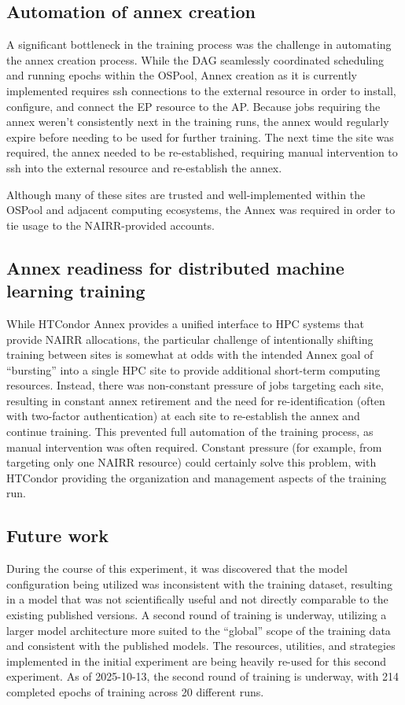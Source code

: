 \documentclass{article}
\begin{document}
\subsection{Automation of annex creation}
A significant bottleneck in the training process was the challenge in automating
the annex creation process. While the DAG seamlessly coordinated scheduling and
running epochs within the OSPool, Annex creation as it is currently implemented
requires ssh connections to the external resource in order to install,
configure, and connect the EP resource to the AP. Because jobs requiring the
annex weren't consistently next in the training runs, the annex would regularly
expire before needing to be used for further training. The next time the site
was required, the annex needed to be re-established, requiring manual
intervention to ssh into the external resource and re-establish the annex.

Although many of these sites are trusted and well-implemented within the OSPool
and adjacent computing ecosystems, the Annex was required in order to tie usage
to the NAIRR-provided accounts.

\subsection{Annex readiness for distributed machine learning training}
While HTCondor Annex provides a unified interface to HPC systems that provide
NAIRR allocations, the particular challenge of intentionally shifting training
between sites is somewhat at odds with the intended Annex goal of ``bursting''
into a single HPC site to provide additional short-term computing resources.
Instead, there was non-constant pressure of jobs targeting each site, resulting
in constant annex retirement and the need for re-identification (often with
two-factor authentication) at each site to re-establish the annex and continue
training. This prevented full automation of the training process, as manual
intervention was often required. Constant pressure (for example, from targeting
only one NAIRR resource) could certainly solve this problem, with HTCondor
providing the organization and management aspects of the training run.
\subsection{Future work}
During the course of this experiment, it was discovered that the model
configuration being utilized was inconsistent with the training dataset,
resulting in a model that was not scientifically useful and not directly
comparable to the existing published versions. A second round of training is
underway, utilizing a larger model architecture more suited to the ``global''
scope of the training data and consistent with the published models. The
resources, utilities, and strategies implemented in the initial experiment are
being heavily re-used for this second experiment. As of 2025-10-13, the second
round of training is underway, with 214 completed epochs of training across 20
different runs.
\end{document}
